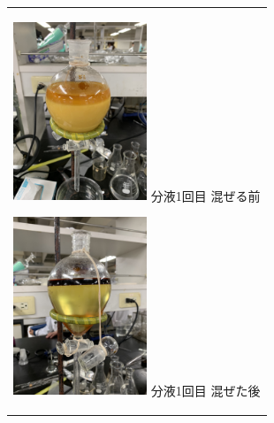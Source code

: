 \documentclass[a4paper,papersize,dvipdfmx]{jsarticle}
\begin{document}
\begin{figure}[H]
\begin{center}
\begin{tabular}{c}


\begin{minipage}{0.20\hsize}
\begin{center}
\includegraphics[clip, width=4cm]{imgs4/be1.jpg}
\hspace{1.6cm} 分液1回目 混ぜる前
\end{center}
\end{minipage}

\begin{minipage}{0.05\hsize}
        \hspace{2mm}
      \end{minipage}

\begin{minipage}{0.20\hsize}
\begin{center}
\includegraphics[clip, width=4cm]{imgs4/be2.jpg}
\hspace{1.6cm} 分液1回目 混ぜた後
\end{center}
\end{minipage}

\begin{minipage}{0.05\hsize}
        \hspace{2mm}
      \end{minipage}


\end{tabular}
\end{center}
\end{figure}
\end{document}
